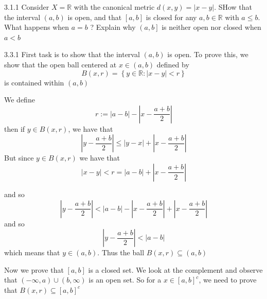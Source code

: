 \documentclass[a4paper,norsk]{article}
\renewcommand{\leq}{\leqslant}
\begin{document}
\begin{oppgavebox}{3.1.1}{}
Consider $ X = \mathbb{R} $ with the canonical metric $ d(x, y) = \left| x - y \right|  $. SHow that the interval $ \left( a, b \right)  $ is open, and that $ \left[ a, b \right]  $ is closed for any $ a,b \in \mathbb{R} $ with $ a \leq b $. What happens when $ a=b $ ? Explain why $ \left( a, b \right] $ is neither open nor closed when $ a < b $ 

\begin{proofbox}{3.3.1}{}
  First task is to show that the interval $ \left( a,b \right)  $ is open. To prove this, we show that the open ball centered at $ x \in  \left( a, b \right)  $ defined by 
  \[
      B \left( x, r \right) = \left\{ y \in \mathbb{R} : \left| x - y \right| < r \right\} 
  \]
  is contained within $ \left( a, b \right)  $ 

  We define 
  \[
      r := \left| a - b \right|  - \left| x - \frac{ a+b }{ 2 } \right| 
  \]
  then if $ y \in B \left( x, r \right)  $, we have that 
  \[
      \left| y - \frac{ a+b }{ 2 } \right| \leq \left| y - x  \right| + \left| x - \frac{ a+b }{ 2 } \right|  
  \]
  But since $ y \in  B \left( x, r \right)  $ we have that 
  $$ \left| x-y \right| < r = \left| a-b \right| + \left| x - \frac{ a+b }{ 2 } \right|  $$ 

  and so 
  \[
      \left| y - \frac{ a+b }{ 2 } \right| < \left| a-b \right| - \left| x - \frac{ a+b }{ 2 } \right| + \left| x - \frac{ a+b }{ 2 } \right| 
  \]
  and so
  \[
      \left| y - \frac{ a+b }{ 2 } \right| < \left| a-b \right| 
  \]
  which means that $ y \in \left( a,b \right)  $. Thus the ball $ B \left( x, r \right) \subseteq \left( a,b \right)  $ 



  Now we prove that $ \left[ a, b \right]  $ is a closed set. We look at the complement and observe that $ \left( - \infty , a \right)   \cup \left( b, \infty \right)  $  is an open set. So for a $ x \in  \left[ a, b \right] ^c $, we need to prove that $ B \left( x, r \right) \subseteq \left[ a, b \right] ^c  $ 
  

\end{proofbox}
\end{oppgavebox}
\end{document}
